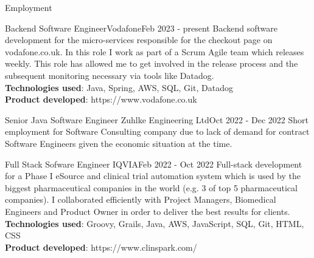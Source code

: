 \documentclass[]{mcdowellcv}
\begin{document}
  \begin{cvsection}{Employment}

		\begin{cvsubsection}{Backend Software Engineer}{Vodafone}{Feb 2023 - present}
			\hspace{\parindent} \hspace{\parindent} \hspace{\parindent} \hspace{\parindent} 
				Backend software development for the micro-services responsible for the checkout page on vodafone.co.uk. In this role I work as part of a Scrum Agile team which releases weekly. This role has allowed me to get involved in the release process and the subsequent monitoring necessary via tools like Datadog.
			\\ \textbf{Technologies used}: Java, Spring, AWS, SQL, Git, Datadog
			\\ \textbf{Product developed}: https://www.vodafone.co.uk
		\end{cvsubsection}

		\begin{cvsubsection}{Senior Java Software Engineer }{Zuhlke Engineering Ltd}{Oct 2022 - Dec 2022}
			\hspace{\parindent} \hspace{\parindent} \hspace{\parindent} \hspace{\parindent} Short employment for Software Consulting company due to lack of demand for contract Software Engineers given the economic situation at the time. 
		\end{cvsubsection}

	    \begin{cvsubsection}{Full Stack Sofware Engineer }{IQVIA}{Feb 2022 - Oct 2022}
			\hspace{\parindent} \hspace{\parindent} \hspace{\parindent} \hspace{\parindent} Full-stack development for a Phase I eSource and clinical trial automation system which is used by the biggest pharmaceutical companies in the world (e.g. 3 of top 5 pharmaceutical companies). I collaborated efficiently with Project Managers, Biomedical Engineers and Product Owner in order to deliver the best results for clients. 
			\\ \textbf{Technologies used}: Groovy, Grails, Java, AWS, JavaScript, SQL, Git, HTML, CSS
			\\ \textbf{Product developed}: https://www.clinspark.com/
		\end{cvsubsection}


\end{cvsection}
\end{document}
